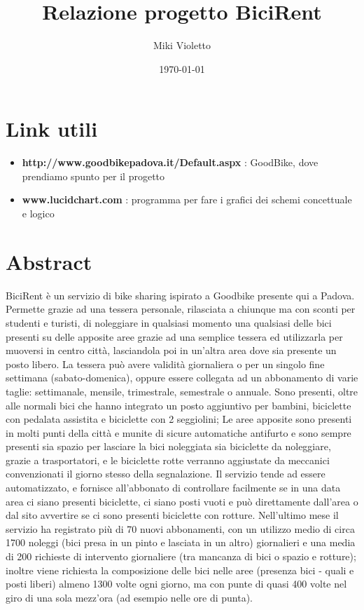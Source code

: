 \documentclass[a4paper,twoside]{article}
\author{Miki Violetto}
\title{Relazione progetto BiciRent}
\date{\today}
\begin{document}
\maketitle

\newpage
\tableofcontents

\newpage
\section{Link utili}
\begin{itemize}
\item \textbf{http://www.goodbikepadova.it/Default.aspx} : GoodBike, dove prendiamo spunto per il progetto
\item \textbf{www.lucidchart.com} : programma per fare i grafici dei schemi concettuale e logico
\end{itemize}

\section{Abstract}
BiciRent è un servizio di bike sharing ispirato a Goodbike presente qui a Padova.\newline
Permette grazie ad una tessera personale, rilasciata a chiunque ma con sconti per studenti e turisti, di noleggiare in qualsiasi momento una qualsiasi delle bici presenti su delle apposite aree grazie ad una semplice tessera ed utilizzarla per muoversi in centro città, lasciandola poi in un'altra area dove sia presente un posto libero.\newline
La tessera può avere validità giornaliera o per un singolo fine settimana (sabato-domenica), oppure essere collegata ad un abbonamento di varie taglie: settimanale, mensile, trimestrale, semestrale o  annuale.\newline
Sono presenti, oltre alle normali bici che hanno integrato un posto aggiuntivo per bambini, biciclette con pedalata assistita e biciclette con 2 seggiolini;\newline
Le aree apposite sono presenti in molti punti della città e munite di sicure automatiche antifurto e sono sempre presenti sia spazio per lasciare la bici noleggiata sia biciclette da noleggiare, grazie a trasportatori, e le biciclette rotte verranno aggiustate da meccanici convenzionati il giorno stesso della segnalazione.\newline
Il servizio tende ad essere automatizzato, e fornisce all'abbonato di controllare facilmente se in una data area ci siano presenti biciclette, ci siano posti vuoti e può direttamente dall'area o dal sito avvertire se ci sono presenti biciclette con rotture.\newline
Nell'ultimo mese il servizio ha registrato più di 70 nuovi abbonamenti, con un utilizzo medio di circa 1700 noleggi (bici presa in un pinto e lasciata in un altro) giornalieri e una media di 200 richieste di intervento giornaliere (tra mancanza di bici o spazio e rotture);\newline
inoltre viene richiesta la composizione delle bici nelle aree (presenza bici - quali e posti liberi) almeno 1300 volte ogni giorno, ma con punte di quasi 400 volte nel giro di una sola mezz'ora (ad esempio nelle ore di punta).
\end{document}
